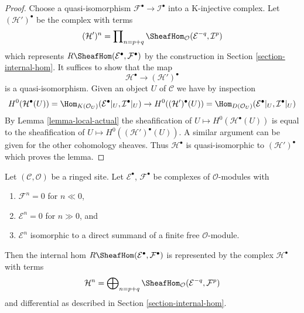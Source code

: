 \begin{proof}
Choose a quasi-isomorphism $\mathcal{F}^\bullet \to \mathcal{I}^\bullet$
into a K-injective complex. Let $(\mathcal{H}')^\bullet$ be the
complex with terms
$$
(\mathcal{H}')^n =
\prod\nolimits_{n = p + q}
\SheafHom_\mathcal{O}(\mathcal{E}^{-q}, \mathcal{I}^p)
$$
which represents $R\SheafHom(\mathcal{E}^\bullet, \mathcal{F}^\bullet)$
by the construction in Section \ref{section-internal-hom}. It suffices
to show that the map
$$
\mathcal{H}^\bullet \longrightarrow (\mathcal{H}')^\bullet
$$
is a quasi-isomorphism. Given an object $U$ of $\mathcal{C}$ we have
by inspection
$$
H^0(\mathcal{H}^\bullet(U)) =
\Hom_{K(\mathcal{O}_U)}(\mathcal{E}^\bullet|_U, \mathcal{I}^\bullet|_U)
\to
H^0((\mathcal{H}')^\bullet(U)) =
\Hom_{D(\mathcal{O}_U)}(\mathcal{E}^\bullet|_U, \mathcal{I}^\bullet|_U)
$$
By Lemma \ref{lemma-local-actual} the sheafification of
$U \mapsto H^0(\mathcal{H}^\bullet(U))$
is equal to the sheafification of
$U \mapsto H^0((\mathcal{H}')^\bullet(U))$. A similar argument can be
given for the other cohomology sheaves. Thus $\mathcal{H}^\bullet$
is quasi-isomorphic to $(\mathcal{H}')^\bullet$ which proves the lemma.
\end{proof}

\begin{lemma}
\label{lemma-Rhom-complex-of-direct-summands-finite-free}
Let $(\mathcal{C}, \mathcal{O})$ be a ringed site.
Let $\mathcal{E}^\bullet$, $\mathcal{F}^\bullet$ be complexes
of $\mathcal{O}$-modules with
\begin{enumerate}
\item $\mathcal{F}^n = 0$ for $n \ll 0$,
\item $\mathcal{E}^n = 0$ for $n \gg 0$, and
\item $\mathcal{E}^n$ isomorphic to a direct summand of a finite
free $\mathcal{O}$-module.
\end{enumerate}
Then the internal hom $R\SheafHom(\mathcal{E}^\bullet, \mathcal{F}^\bullet)$
is represented by the complex $\mathcal{H}^\bullet$ with terms
$$
\mathcal{H}^n =
\bigoplus\nolimits_{n = p + q}
\SheafHom_\mathcal{O}(\mathcal{E}^{-q}, \mathcal{F}^p)
$$
and differential as described in Section \ref{section-internal-hom}.
\end{lemma}

